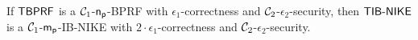 \begin{theorem}
\label{thm:time-ibnike-security}
If $\mathsf{TBPRF}$ is a $\mathcal{C}_1$-$\mathsf{n_p}$-BPRF with $\epsilon_1$-correctness and $\mathcal{C}_2$-$\epsilon_2$-security, then $\mathsf{TIB\text{-}NIKE}$ is a $\mathcal{C}_1$-$\mathsf{m_p}$-IB-NIKE with $2\cdot\epsilon_1$-correctness and $\mathcal{C}_2$-$\epsilon_2$-security.
\end{theorem}
